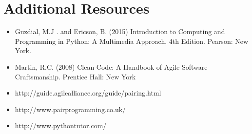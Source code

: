 \documentclass{../fal_assignment}
\begin{document}
\section*{Additional Resources}

\begin{itemize}
    \item Guzdial, M.J . and Ericson, B. (2015) Introduction to Computing and Programming in Python: A Multimedia Approach, 4th Edition. Pearson: New York.
    \item Martin, R.C. (2008) Clean Code: A Handbook of Agile Software Craftsmanship. Prentice Hall: New York
    \item http://guide.agilealliance.org/guide/pairing.html
    \item http://www.pairprogramming.co.uk/
    \item http://www.pythontutor.com/
\end{itemize}
\end{document}
